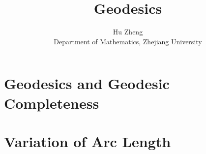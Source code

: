 \documentclass[11pt]{article}
\title{Geodesics}
\author{Hu Zheng \\ Department of Mathematics, Zhejiang University}
\numberwithin{problem}{section}
\begin{document}
\maketitle

\section{Geodesics and Geodesic Completeness}


\section{Variation of Arc Length}
\end{document}
